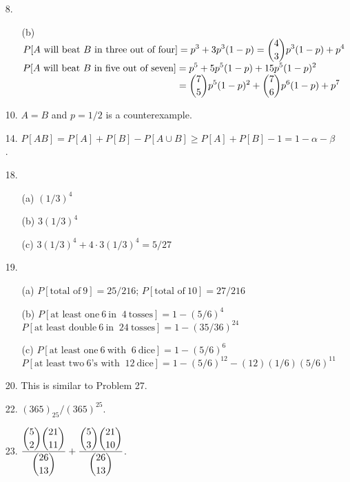 \begin{enumerate}
	\item[8.] \begin{enumerate}
		\item[(b)] $\displaystyle P[A\ \text{will beat}\ B\ \text{in three out of four}] = p^3+3p^3(1-p) = {4\choose 3}p^3(1-p) + p^4$ \\
		$\displaystyle P[A\ \text{will beat}\ B\ \text{in five out of seven}] = p^5 + 5p^5(1-p) + 15p^5(1-p)^2$ \\
		$\dsp \phantom{P[A\ \text{will beat}\ B\ \text{in five out of seven}]} = {7\choose 5}p^5(1-p)^2 + {7\choose 6}p^6(1-p) + p^7$
	\end{enumerate}

	\item[10.] $A = B$ and $p=1/2$ is a counterexample.
	
	\item[14.] $P[AB] = P[A]+P[B]-P[A\cup B] \ge P[A] +P[B]-1  = 1-\alpha - \beta$.
	
	\item[18.] \begin{enumerate}
		\item[(a)] $(1/3)^4$
		\item[(b)] $3(1/3)^4$
		\item[(c)] $3(1/3)^4 + 4\cdot 3(1/3)^4 = 5/27$
	\end{enumerate}

	\item[19.]\begin{enumerate}
		\item[(a)] $P[\text{total of}\ 9] = 25/216$; $P[\text{total of}\ 10] = 27/216$
		\item[(b)] $P[\text{at least one}\ 6\ \text{in }\ 4\ \text{tosses}] = 1- (5/6)^4$\\
				$P[\text{at least double}\ 6\ \text{in }\ 24\ \text{tosses}] = 1- (35/36)^{24}$
		\item[(c)] $P[\text{at least one}\ 6\ \text{with }\ 6\ \text{dice}] = 1- (5/6)^6$\\
		$P[\text{at least two}\ 6\text{'s with }\ 12\ \text{dice}] = 1- (5/6)^{12} - (12)(1/6)(5/6)^{11}$
	\end{enumerate}

	\newpage
	
	\item[20.] This is similar to Problem 27.
	
	\item[22.] $(365)_{25}/(365)^{25}$.
	
	\item[23.] $\dfrac{\displaystyle {5\choose 2}{21\choose 11}}{\displaystyle {26\choose 13}} + \dfrac{\displaystyle {5\choose 3}{21\choose 10}}{\displaystyle {26\choose 13}}$.
	

\end{enumerate}
